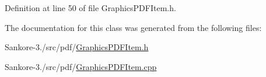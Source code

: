 Definition at line 50 of file Graphics\-P\-D\-F\-Item.\-h.



The documentation for this class was generated from the following files\-:\begin{DoxyCompactItemize}
\item 
Sankore-\/3./src/pdf/\hyperlink{_graphics_p_d_f_item_8h}{Graphics\-P\-D\-F\-Item.\-h}\item 
Sankore-\/3./src/pdf/\hyperlink{_graphics_p_d_f_item_8cpp}{Graphics\-P\-D\-F\-Item.\-cpp}\end{DoxyCompactItemize}
